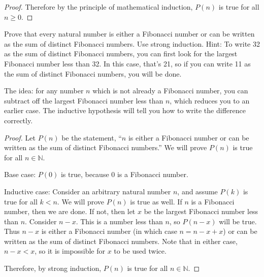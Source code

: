 \documentclass[11pt]{exam}
\def\N{\mathbb N}
\begin{document}
\begin{questions}
\begin{solution}
\begin{proof}
    Therefore by the principle of mathematical induction, $P(n)$ is true for all $n \ge 0$.
  \end{proof}

\end{solution}


\question[6] Prove that every natural number is either a Fibonacci number or can be written as the sum of distinct Fibonacci numbers.  Use strong induction.  Hint: To write 32 as the sum of distinct Fibonacci numbers, you can first look for the largest Fibonacci number less than 32.  In this case, that's 21, so if you can write 11 as the sum of distinct Fibonacci numbers, you will be done.

\begin{solution}
	The idea: for any number $n$ which is not already a Fibonacci number, you can subtract off the largest Fibonacci number less than $n$, which reduces you to an earlier case.  The inductive hypothesis will tell you how to write the difference correctly.
	
	\begin{proof}
		Let $P(n)$ be the statement, ``$n$ is either a Fibonacci number or can be written as the sum of distinct Fibonacci numbers.''  We will prove $P(n)$ is true for all $n \in \N$.
		
		Base case: $P(0)$ is true, because $0$ is a Fibonacci number.
		
		Inductive case: Consider an arbitrary natural number $n$, and assume $P(k)$ is true for all $k < n$.  We will prove $P(n)$ is true as well.  If $n$ is a Fibonacci number, then we are done.  If not, then let $x$ be the largest Fibonacci number less than $n$.  Consider $n-x$.  This is a number less than $n$, so $P(n-x)$ will be true.  Thus $n-x$ is either a Fibonacci number (in which case $n = n-x + x$) or can be written as the sum of distinct Fibonacci numbers.  Note that in either case, $n-x < x$, so it is impossible for $x$ to be used twice. 
		
		Therefore, by strong induction, $P(n)$ is true for all $n \in \N$.
	
	\end{proof} 
\end{solution}
\end{questions}
\end{document}
